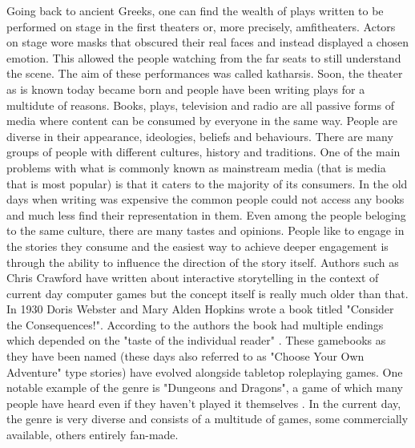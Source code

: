Going back to ancient Greeks, one can find the wealth of plays written to be performed on stage in the first theaters or, more precisely, amfitheaters.
Actors on stage wore masks that obscured their real faces and instead displayed a chosen emotion.
This allowed the people watching from the far seats to still understand the scene.
The aim of these performances was called katharsis\cite{hart2010art}.
Soon, the theater as is known today became born and people have been writing plays for a multidute of reasons.
Books, plays, television and radio are all passive forms of media where content can be consumed by everyone in the same way.
People are diverse in their appearance, ideologies, beliefs and behaviours.
There are many groups of people with different cultures, history and traditions.
One of the main problems with what is commonly known as mainstream media (that is media that is most popular) is that it caters to the majority of its consumers.
In the old days when writing was expensive the common people could not access any books and much less find their representation in them.
Even among the people beloging to the same culture, there are many tastes and opinions.
People like to engage in the stories they consume and the easiest way to achieve deeper engagement is through the ability to influence the direction of the story itself.
Authors such as Chris Crawford\cite{crawford2013interactive} have written about interactive storytelling in the context of current day computer games but the concept itself is really much older than that.
In 1930 Doris Webster and Mary Alden Hopkins wrote a book titled "Consider the Consequences!".
According to the authors the book had multiple endings which depended on the "taste of the individual reader" \cite{webster1930consequences}.
These gamebooks as they have been named (these days also referred to as "Choose Your Own Adventure" type stories\cite{kraft1981cyoa}) have evolved alongside tabletop roleplaying games.
One notable example of the genre is "Dungeons and Dragons", a game of which many people have heard even if they haven't played it themselves \cite{gygax1974dungeons}.
In the current day, the genre is very diverse and consists of a multitude of games, some commercially available, others entirely fan-made.


